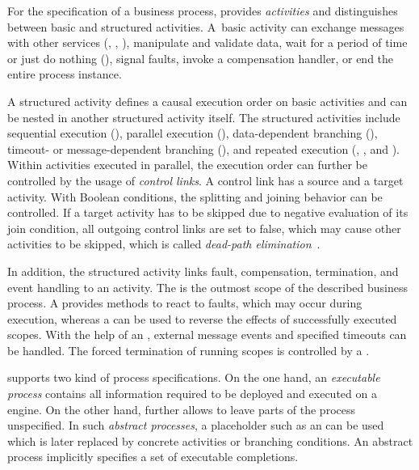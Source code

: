 For the specification of a business process,  provides \emph{activities} and distinguishes between basic and structured activities. A~basic activity can exchange messages with other services (, , ), manipulate and validate data, wait for a period of time or just do nothing (), signal faults, invoke a compensation handler, or end the entire process instance.

A structured activity defines a causal execution order on basic activities and can be nested in another structured activity itself. The structured activities include sequential execution (), parallel execution (), data-dependent branching (), timeout- or message-dependent branching (), and repeated execution (, , and ). Within activities executed in parallel, the execution order can further be controlled by the usage of \emph{control links}. A control link has a source and a target activity. With Boolean conditions, the splitting and joining behavior can be controlled. If a target activity has to be skipped due to negative evaluation of its join condition, all outgoing control links are set to false, which may cause other activities to be skipped, which is called \emph{dead-path elimination}~\cite{LeymannR_1999_dpe}.

In addition, the structured activity  links fault, compensation, termination, and event handling to an activity. The  is the outmost scope of the described business process. A  provides methods to react to faults, which may occur during execution, whereas a  can be used to reverse the effects of successfully executed scopes. With the help of an , external message events and specified timeouts can be handled. The forced termination of running scopes is controlled by a .

 supports two kind of process specifications. On the one hand, an \emph{executable process} contains all information required to be deployed and executed on a  engine. On the other hand,  further allows to leave parts of the process unspecified. In such \emph{abstract processes}, a placeholder such as an  can be used which is later replaced by concrete activities or branching conditions. An abstract process implicitly specifies a set of executable completions.

